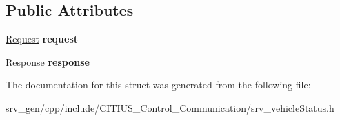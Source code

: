 \subsection*{\-Public \-Attributes}
\begin{DoxyCompactItemize}
\item 
\hypertarget{struct_c_i_t_i_u_s___control___communication_1_1srv__vehicle_status_ae796847be40bfec1e7ef5ae06f78490a}{\hyperlink{struct_c_i_t_i_u_s___control___communication_1_1srv__vehicle_status_request__}{\-Request} {\bfseries request}}\label{struct_c_i_t_i_u_s___control___communication_1_1srv__vehicle_status_ae796847be40bfec1e7ef5ae06f78490a}

\item 
\hypertarget{struct_c_i_t_i_u_s___control___communication_1_1srv__vehicle_status_ad5d70cf1cb859a975384d756a3688b97}{\hyperlink{struct_c_i_t_i_u_s___control___communication_1_1srv__vehicle_status_response__}{\-Response} {\bfseries response}}\label{struct_c_i_t_i_u_s___control___communication_1_1srv__vehicle_status_ad5d70cf1cb859a975384d756a3688b97}

\end{DoxyCompactItemize}


\-The documentation for this struct was generated from the following file\-:\begin{DoxyCompactItemize}
\item 
srv\-\_\-gen/cpp/include/\-C\-I\-T\-I\-U\-S\-\_\-\-Control\-\_\-\-Communication/srv\-\_\-vehicle\-Status.\-h\end{DoxyCompactItemize}
